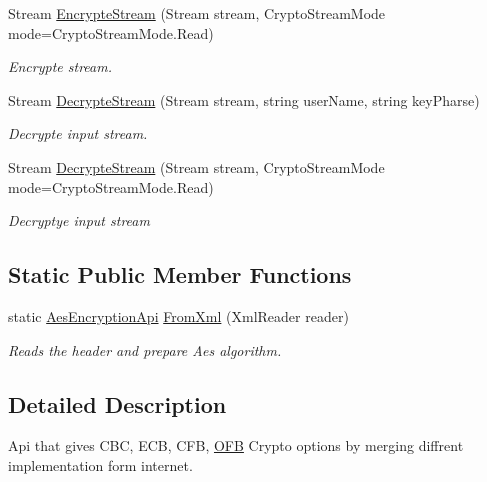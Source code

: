 \begin{DoxyCompactItemize}
Stream \mbox{\hyperlink{class_b_s_k___encryption_1_1_encryption_1_1_aes_encryption_api_ac15e90b0d83aeaba75361b90d81b7f8b}{Encrypte\+Stream}} (Stream stream, Crypto\+Stream\+Mode mode=Crypto\+Stream\+Mode.\+Read)
\begin{DoxyCompactList}\small\item\em Encrypte stream. \end{DoxyCompactList}\item 
Stream \mbox{\hyperlink{class_b_s_k___encryption_1_1_encryption_1_1_aes_encryption_api_a2ba1d764ff07efb3dbca0705686a39bc}{Decrypte\+Stream}} (Stream stream, string user\+Name, string key\+Pharse)
\begin{DoxyCompactList}\small\item\em Decrypte input stream. \end{DoxyCompactList}\item 
Stream \mbox{\hyperlink{class_b_s_k___encryption_1_1_encryption_1_1_aes_encryption_api_a0e296b549e33928ca5634bf2ad309071}{Decrypte\+Stream}} (Stream stream, Crypto\+Stream\+Mode mode=Crypto\+Stream\+Mode.\+Read)
\begin{DoxyCompactList}\small\item\em Decryptye input stream \end{DoxyCompactList}\end{DoxyCompactItemize}
\subsection*{Static Public Member Functions}
\begin{DoxyCompactItemize}
\item 
static \mbox{\hyperlink{class_b_s_k___encryption_1_1_encryption_1_1_aes_encryption_api}{Aes\+Encryption\+Api}} \mbox{\hyperlink{class_b_s_k___encryption_1_1_encryption_1_1_aes_encryption_api_a5aed874c297b96310a667a88c9060bf7}{From\+Xml}} (Xml\+Reader reader)
\begin{DoxyCompactList}\small\item\em Reads the header and prepare Aes algorithm. \end{DoxyCompactList}\end{DoxyCompactItemize}


\subsection{Detailed Description}
Api that gives C\+BC, E\+CB, C\+FB, \mbox{\hyperlink{namespace_b_s_k___encryption_1_1_encryption_1_1_o_f_b}{O\+FB}} Crypto options by merging diffrent implementation form internet. 



